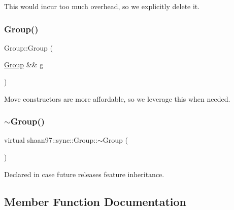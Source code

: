 This would incur too much overhead, so we explicitly delete it. 

\mbox{\label{classshaan97_1_1sync_1_1_group_af43934a8317bce6f5e397ffd8db3beef}} 
\subsubsection{\texorpdfstring{Group()}{Group()}\hspace{0.1cm}{\footnotesize\ttfamily [3/3]}}
{\footnotesize\ttfamily Group\+::\+Group (\begin{DoxyParamCaption}\item[{\hyperlink{classshaan97_1_1sync_1_1_group}{Group} \&\&}]{g }\end{DoxyParamCaption})}



Move constructors are more affordable, so we leverage this when needed. 

\mbox{\label{classshaan97_1_1sync_1_1_group_a2c2875d3cdf23d27031c362cfb123f96}} 
\subsubsection{\texorpdfstring{$\sim$\+Group()}{~Group()}}
{\footnotesize\ttfamily virtual shaan97\+::sync\+::\+Group\+::$\sim$\+Group (\begin{DoxyParamCaption}{ }\end{DoxyParamCaption})\hspace{0.3cm}{\ttfamily [virtual]}}



Declared in case future releases feature inheritance. 



\subsection{Member Function Documentation}
\mbox{\label{classshaan97_1_1sync_1_1_group_a68562104689d868509a0368675a7b51d}} 
